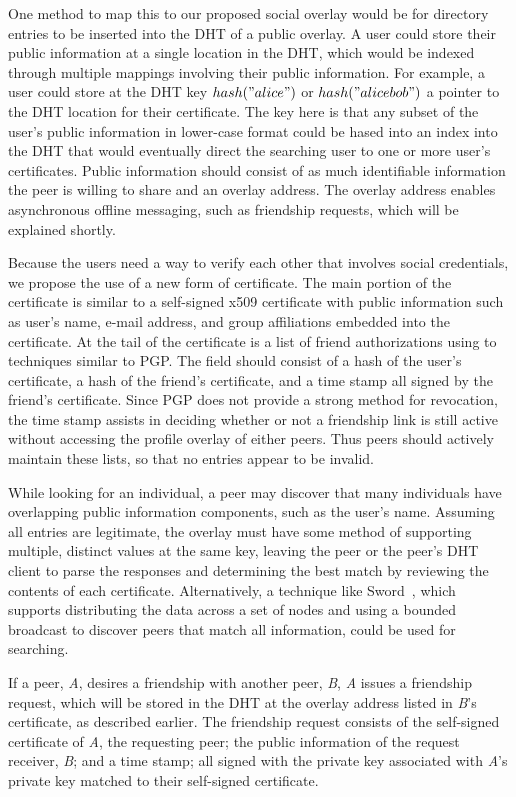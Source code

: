 \documentclass[conference]{IEEEtran}
\begin{document}
One method to map this to our proposed social overlay would be for directory
entries to be inserted into the DHT of a public overlay.  A user could store
their public information at a single location in the DHT, which would be
indexed through multiple mappings involving their public information.  For
example, a user could store at the DHT key $hash("alice")$ or $hash("alice
bob")$ a pointer to the DHT location for their certificate.  The key here is
that any subset of the user's public information in lower-case format could be
hased into an index into the DHT that would eventually direct the searching
user to one or more user's certificates.  Public information should consist of
as much identifiable information the peer is willing to share and an overlay
address.  The overlay address enables asynchronous offline messaging, such as
friendship requests, which will be explained shortly.

Because the users need a way to verify each other that involves social
credentials, we propose the use of a new form of certificate.  The main portion
of the certificate is similar to a self-signed x509 certificate with public
information such as user's name, e-mail address, and group affiliations
embedded into the certificate.  At the tail of the certificate is a list of
friend authorizations using to techniques similar to PGP.  The field should
consist of a hash of the user's certificate, a hash of the friend's
certificate, and a time stamp all signed by the friend's certificate.  Since
PGP does not provide a strong method for revocation, the time stamp assists in
deciding whether or not a friendship link is still active without accessing the
profile overlay of either peers.  Thus peers should actively maintain these
lists, so that no entries appear to be invalid.

While looking for an individual, a peer may discover that many individuals
have overlapping public information components, such as the user's name.
Assuming all entries are legitimate, the overlay must have some method of
supporting multiple, distinct values at the same key, leaving the peer or the
peer's DHT client to parse the responses and determining the best match by
reviewing the contents of each certificate.  Alternatively, a technique like
Sword~\cite{sword}, which supports distributing the data across a set of nodes
and using a bounded broadcast to discover peers that match all information,
could be used for searching.

If a peer, \textit{A}, desires a friendship with another peer, \textit{B},
\textit{A} issues a friendship request, which will be stored in the DHT at the
overlay address listed in \textit{B}'s certificate, as described earlier.  The
friendship request consists of the self-signed certificate of \textit{A}, the
requesting peer; the public information of the request receiver, \textit{B};
and a time stamp; all signed with the private key associated with \textit{A}'s
private key matched to their self-signed certificate.
\end{document}
